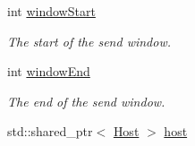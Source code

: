 \begin{DoxyCompactItemize}
\item 
int \hyperlink{classFlow_a1c04de60a81b02750673806906701a76}{window\-Start}
\begin{DoxyCompactList}\small\item\em \-The start of the send window. \end{DoxyCompactList}\item 
int \hyperlink{classFlow_a8ffd0d6dd0bf1c2c2b97ac164890715f}{window\-End}
\begin{DoxyCompactList}\small\item\em \-The end of the send window. \end{DoxyCompactList}\item 
\hypertarget{classFlow_af45cdc7b3609577eb08cb072e9631809}{std\-::shared\-\_\-ptr$<$ \hyperlink{classHost}{\-Host} $>$ \hyperlink{classFlow_af45cdc7b3609577eb08cb072e9631809}{host}}\label{classFlow_af45cdc7b3609577eb08cb072e9631809}


\end{DoxyCompactItemize}
